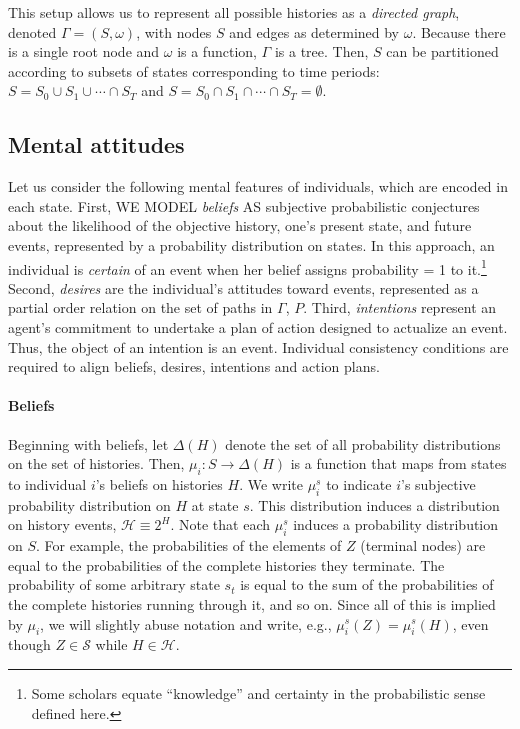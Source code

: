 \documentclass[
11pt,
titlepage,
reqno,
]{article}%
\theoremstyle{definition}
\begin{document}
	This setup allows us to represent all possible histories as a \textit{directed graph}, denoted $\Gamma=(S,\omega)$, with nodes $S$ and edges as determined by  $\omega$.  
	Because there is a single root node and $\omega$ is a function, $\Gamma$ is a tree.
	Then, $S$ can be partitioned according to  subsets of states corresponding to time periods: $S=S_0\cup S_1\cup \cdots\cap S_T$ and $S=S_0\cap S_1\cap \cdots\cap S_T = \emptyset$.
	 
	
	
	
	\subsection{Mental attitudes\label{sec:attitudes}}
	Let us consider the following mental features of individuals, which are encoded in each state. 
	First, WE MODEL \textit{beliefs} AS subjective probabilistic conjectures about the likelihood of the objective history, one's present state, and future events, represented by a probability distribution on states. 
	In this approach, an individual is \textit{certain} of an event when her belief assigns probability = 1 to it.\footnote
	{
		Some scholars equate ``knowledge'' and certainty in the probabilistic sense defined here. 
	} 
	Second, \textit{desires} are the individual's attitudes toward events, represented as a partial order relation on the set of paths in $\Gamma$, $P$. 
	Third, \textit{intentions} represent an agent's commitment to undertake a plan of action designed to actualize an event. 
	Thus, the object of an intention is an event. Individual consistency conditions are required to align beliefs, desires, intentions and action plans. 
	
	\paragraph*{Beliefs \label{para: beliefs}}
	Beginning with beliefs, let $\Delta(H)$ denote the set of all probability distributions on the set of histories. 
	Then,  $\mu_i:S\rightarrow \Delta(H)$ is a function that maps from states to individual $i$'s beliefs on histories $H$. 
	We write  $\mu_i^s$ to indicate $i$'s subjective probability distribution on $H$ at state $s$.
	This distribution induces a distribution on history events, $\mathcal{H}\equiv 2^H$. 
	Note that each $\mu_i^s$ induces a probability distribution on $S$.
	For example, the probabilities of the elements of $Z$ (terminal nodes) are equal to the probabilities of the complete histories they terminate. 
	The probability of some arbitrary state $s_t$ is equal to the sum of the probabilities of the complete histories running through it, and so on.
	Since all of this is implied by $\mu_i$, we will slightly abuse notation and write, e.g.,  $\mu_i^s(Z)=\mu_i^s(H)$, even though $Z\in \mathcal{S}$ while $H\in \mathcal{H}$.
	
\end{document}
